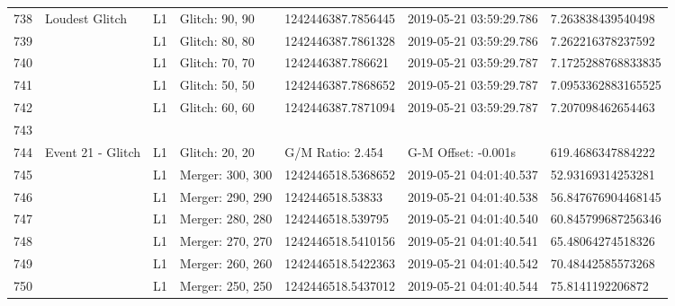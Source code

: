 \begin{longtable}{lllllll}
738  &                                     Loudest Glitch &       L1 &    Glitch: 90, 90 &  1242446387.7856445 &  2019-05-21 03:59:29.786 &   7.263838439540498 \\
739  &                                                    &       L1 &    Glitch: 80, 80 &  1242446387.7861328 &  2019-05-21 03:59:29.786 &   7.262216378237592 \\
740  &                                                    &       L1 &    Glitch: 70, 70 &   1242446387.786621 &  2019-05-21 03:59:29.787 &  7.1725288768833835 \\
741  &                                                    &       L1 &    Glitch: 50, 50 &  1242446387.7868652 &  2019-05-21 03:59:29.787 &  7.0953362883165525 \\
742  &                                                    &       L1 &    Glitch: 60, 60 &  1242446387.7871094 &  2019-05-21 03:59:29.787 &   7.207098462654463 \\
743  &                                                    &          &                   &                     &                          &                     \\
744  &                                  Event 21 - Glitch &       L1 &    Glitch: 20, 20 &    G/M Ratio: 2.454 &      G-M Offset: -0.001s &   619.4686347884222 \\
745  &                                                    &       L1 &  Merger: 300, 300 &  1242446518.5368652 &  2019-05-21 04:01:40.537 &   52.93169314253281 \\
746  &                                                    &       L1 &  Merger: 290, 290 &    1242446518.53833 &  2019-05-21 04:01:40.538 &  56.847676904468145 \\
747  &                                                    &       L1 &  Merger: 280, 280 &   1242446518.539795 &  2019-05-21 04:01:40.540 &  60.845799687256346 \\
748  &                                                    &       L1 &  Merger: 270, 270 &  1242446518.5410156 &  2019-05-21 04:01:40.541 &   65.48064274518326 \\
749  &                                                    &       L1 &  Merger: 260, 260 &  1242446518.5422363 &  2019-05-21 04:01:40.542 &   70.48442585573268 \\
750  &                                                    &       L1 &  Merger: 250, 250 &  1242446518.5437012 &  2019-05-21 04:01:40.544 &    75.8141192206872 \\

\end{longtable}
